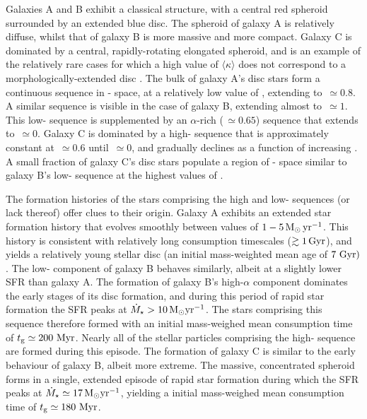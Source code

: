 Galaxies A and B exhibit a classical structure, with a central red spheroid surrounded by an extended blue disc. The spheroid of galaxy A is relatively diffuse, whilst that of galaxy B is more massive and more compact. Galaxy C is dominated by a central, rapidly-rotating elongated spheroid, and is an example of the relatively rare cases for which a high value of $\langle \kappa \rangle$ does not correspond to a morphologically-extended disc \citep[see][]{2017arXiv170406283C}. The bulk of galaxy A's disc stars form a continuous sequence in \afe{}-\feh{} space, at a relatively low value of \afe{}, extending to \feh{}$\,\simeq 0.8$. A similar sequence is visible in the case of galaxy B, extending almost to \feh{}$\,\simeq 1$. This low-\afe{} sequence is supplemented by an $\alpha$-rich (\afe{}$\,\simeq 0.65$) sequence that extends to  \feh{}$\,\simeq 0$. Galaxy C is dominated by a high-\afe{} sequence that is approximately constant at \afe{}$\,\simeq 0.6$ until \feh{}$\,\simeq 0$, and gradually declines as a function of increasing \feh{}. A small fraction of galaxy C's disc stars populate a region of \afe{}-\feh{} space similar to galaxy B's low-\afe{} sequence at the highest values of \feh{}.

The formation histories of the stars comprising the high and low-\afe{} sequences (or lack thereof) offer clues to their origin. Galaxy A exhibits an extended star formation history that evolves smoothly between values of $1-5\,{\rm M}_\odot\,{\rm yr}^{-1}$. This history is consistent with relatively long consumption timescales ($\gtrsim 1\,{\rm Gyr}$), and yields a relatively young stellar disc (an initial mass-weighted mean age of $7\ {\rm Gyr})$. The low-\afe{} component of galaxy B behaves similarly, albeit at a slightly lower SFR than galaxy A. The formation of galaxy B's high-$\alpha$ component dominates the early stages of its disc formation, and during this period of rapid star formation the SFR peaks at $\dot{M}_\star > 10\,{\rm M}_\odot {\rm yr}^{-1}$. The stars comprising this sequence therefore formed with an initial mass-weighed mean consumption time of $t_{\rm g} \simeq 200\ {\rm Myr}$. Nearly all of the stellar particles comprising the high-\afe{} sequence are formed during this episode. The formation of galaxy C is similar to the early behaviour of galaxy B, albeit more extreme. The massive, concentrated spheroid forms in a single, extended episode of rapid star formation during which the SFR peaks at $\dot{M}_\star \simeq 17\,{\rm M}_\odot {\rm yr}^{-1}$, yielding a initial mass-weighed mean consumption time of  $t_{\rm g} \simeq 180\ {\rm Myr}$. 

